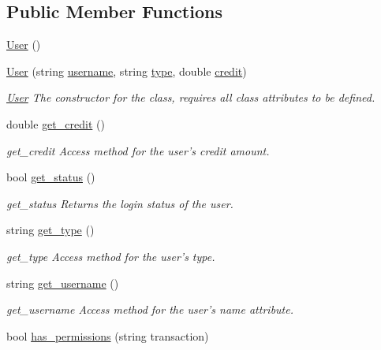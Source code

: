 \subsection*{Public Member Functions}
\begin{DoxyCompactItemize}
\item 
\hyperlink{class_user_aa67031b663e39314207197d3b5dfd735}{User} ()
\item 
\hyperlink{class_user_a210671e4ce72c49e0a715066dd1c24a3}{User} (string \hyperlink{class_user_aad02f271a6536fa078c6d1369ffdadc4}{username}, string \hyperlink{class_user_acce15679d830831b0bbe8ebc2a60b2ca}{type}, double \hyperlink{class_user_aa559c3686bb9d38c3335c16bbea07be8}{credit})
\begin{DoxyCompactList}\small\item\em \hyperlink{class_user}{User} The constructor for the class, requires all class attributes to be defined. \end{DoxyCompactList}\item 
double \hyperlink{class_user_a382625d98be785874d5f8e0081449734}{get\-\_\-credit} ()
\begin{DoxyCompactList}\small\item\em get\-\_\-credit Access method for the user's credit amount. \end{DoxyCompactList}\item 
bool \hyperlink{class_user_ac8415165728fe9043b6883a6397c6748}{get\-\_\-status} ()
\begin{DoxyCompactList}\small\item\em get\-\_\-status Returns the login status of the user. \end{DoxyCompactList}\item 
string \hyperlink{class_user_acc00cb8811b76f10a502bd6bc5810cab}{get\-\_\-type} ()
\begin{DoxyCompactList}\small\item\em get\-\_\-type Access method for the user's type. \end{DoxyCompactList}\item 
string \hyperlink{class_user_a01bfab325cc6e1df7e569c9f09980014}{get\-\_\-username} ()
\begin{DoxyCompactList}\small\item\em get\-\_\-username Access method for the user's name attribute. \end{DoxyCompactList}\item 
bool \hyperlink{class_user_a2964c826aa9dee508272e6302c4f0892}{has\-\_\-permissions} (string transaction)

\end{DoxyCompactItemize}
